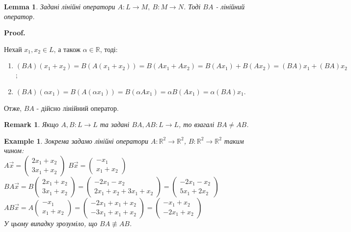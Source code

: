 \documentclass[a4paper, 10pt]{article}
\makeatletter
\theoremstyle{theoremdd}
\newtheorem{example}[theorem]{Example}
\newtheorem{remark}[theorem]{Remark}
\newtheorem{lemma}[theorem]{Lemma}
\renewenvironment{proof}[1][Proof.\\]{\par
\pushQED{\hfill \qed}%
\normalfont \topsep6\p@\@plus6\p@\relax
\trivlist
\item\relax
{\bfseries
#1\@addpunct{.}}\hspace\labelsep\ignorespaces
}{%
\popQED\endtrivlist\@endpefalse
}
\makeatother
\begin{document}
	\begin{lemma}
	Задані лінійні оператори $A \colon L \to M,\ B \colon M \to N$. Тоді $BA$ - лінійний оператор.
	\end{lemma}
	
	\begin{proof}
	Нехай $x_1,x_2 \in L$, а також $\alpha \in \mathbb{R}$, тоді:
	\begin{enumerate}[nosep, wide=0pt, label={\arabic*)}]
	\item $(BA)(x_1+x_2) = B(A(x_1+x_2)) = B(Ax_1+Ax_2)=B(Ax_1) + B(Ax_2)=(BA)x_1+(BA)x_2$;
	\item $(BA)(\alpha x_1) = B(A(\alpha x_1)) = B(\alpha Ax_1) = \alpha B(Ax_1) = \alpha (BA)x_1$.
	\end{enumerate}
	\noindent
	Отже, $BA$ - дійсно лінійний оператор.
	\end{proof}
	
	\begin{remark}
	Якщо $A,B \colon L \to L$ та задані $BA, AB \colon L \to L$, то взагалі $BA \neq AB$.
	\end{remark}
	
	\begin{example}
	Зокрема задамо лінійні оператори $A \colon \mathbb{R}^2 \to \mathbb{R}^2$, $B \colon \mathbb{R}^2 \to \mathbb{R}^2$ таким чином:\\
	$A \vec{x} = \begin{pmatrix}
	2x_1 + x_2 \\ 3x_1 + x_2
	\end{pmatrix}$ \hspace{1cm} $B \vec{x} = \begin{pmatrix}
	-x_1 \\ x_1 + x_2
	\end{pmatrix}$\\
	$BA \vec{x} = B \begin{pmatrix}
	2x_1 + x_2 \\ 3x_1 + x_2
	\end{pmatrix} = \begin{pmatrix}
	-2x_1-x_2 \\ 2x_1+x_2+3x_1+x_2
	\end{pmatrix} = \begin{pmatrix}
	-2x_1-x_2 \\ 5x_1+2x_2
	\end{pmatrix}$\\
	$AB \vec{x} = A \begin{pmatrix}
	-x_1 \\ x_1 + x_2
	\end{pmatrix} = \begin{pmatrix}
	-2x_1 + x_1 + x_2 \\ -3x_1 + x_1 + x_2
	\end{pmatrix} = \begin{pmatrix}
	-x_1 + x_2 \\ -2x_1 + x_2
	\end{pmatrix}$\\
	У цьому випадку зрозуміло, що $BA \not\equiv AB$.
	\end{example}
	
\end{document}
